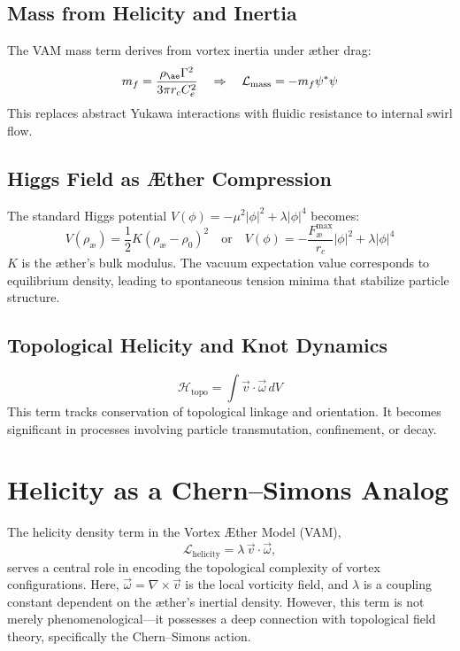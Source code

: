 \subsection{Mass from Helicity and Inertia}
The VAM mass term derives from vortex inertia under æther drag:
\begin{equation}
    m_f = \frac{\rho_{\ae} \Gamma^2}{3\pi r_c C_e^2} \quad\Rightarrow\quad \mathcal{L}_{\text{mass}} = -m_f \psi^* \psi
\end{equation}
This replaces abstract Yukawa interactions with fluidic resistance to internal swirl flow.

\subsection{Higgs Field as Æther Compression}
The standard Higgs potential $V(\phi) = -\mu^2|\phi|^2 + \lambda|\phi|^4$ becomes:
\begin{equation}
    V(\rho_\text{\ae}) = \frac{1}{2}K(\rho_\text{\ae} - \rho_0)^2 \quad\text{or}\quad V(\phi) = -\frac{F^{\text{max}}_{\text{\ae}}}{r_c} |\phi|^2 + \lambda |\phi|^4
\end{equation}
$K$ is the æther's bulk modulus. The vacuum expectation value corresponds to equilibrium density, leading to spontaneous tension minima that stabilize particle structure.

\subsection{Topological Helicity and Knot Dynamics}
\begin{equation}
    \mathcal{H}_\text{topo} = \int \vec{v} \cdot \vec{\omega} \, dV
\end{equation}
This term tracks conservation of topological linkage and orientation. It becomes significant in processes involving particle transmutation, confinement, or decay.

\section{Helicity as a Chern--Simons Analog}

The helicity density term in the Vortex Æther Model (VAM),
\begin{equation}
\mathcal{L}_{\text{helicity}} = \lambda\, \vec{v} \cdot \vec{\omega},
\end{equation}
serves a central role in encoding the topological complexity of vortex configurations. Here, $\vec{\omega} = \nabla \times \vec{v}$ is the local vorticity field, and $\lambda$ is a coupling constant dependent on the æther's inertial density. However, this term is not merely phenomenological—it possesses a deep connection with topological field theory, specifically the Chern--Simons action.

